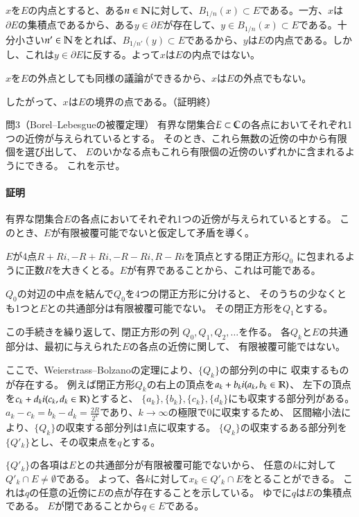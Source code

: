 $x$を$E$の内点とすると、ある$n\in\mathbb{N}$に対して、$B_{1/n}(x)\subset E$である。一方、$x$は$\partial E$の集積点であるから、ある$y\in\partial E$が存在して、$y\in B_{1/n}(x)\subset E$である。十分小さい$n'\in\mathbb{N}$をとれば、$B_{1/n'}(y)\subset E$であるから、$y$は$E$の内点である。しかし、これは$y\in\partial E$に反する。よって$x$は$E$の内点ではない。

$x$を$E$の外点としても同様の議論ができるから、$x$は$E$の外点でもない。

したがって、$x$は$E$の境界の点である。（証明終）

\begin{mysimplebox}{問3（Borel--Lebesgueの被覆定理）}
    有界な閉集合$E\subset\mathbb{C}$の各点においてそれぞれ1つの近傍が与えられているとする。
    そのとき、これら無数の近傍の中から有限個を選び出して、
    $E$のいかなる点もこれら有限個の近傍のいずれかに含まれるようにできる。
    これを示せ。
\end{mysimplebox}
\paragraph{証明}
有界な閉集合$E$の各点においてそれぞれ1つの近傍が与えられているとする。
このとき、$E$が有限被覆可能でないと仮定して矛盾を導く。

$E$が4点$R+Ri, -R+Ri, -R-Ri, R-Ri$を頂点とする閉正方形$Q_0$
に包まれるように正数$R$を大きくとる。$E$が有界であることから、これは可能である。

$Q_0$の対辺の中点を結んで$Q_0$を4つの閉正方形に分けると、
そのうちの少なくとも1つと$E$との共通部分は有限被覆可能でない。
その閉正方形を$Q_1$とする。

この手続きを繰り返して、閉正方形の列
$Q_0, Q_1, Q_2,\dots$を作る。
各$Q_k$と$E$の共通部分は、最初に与えられた$E$の各点の近傍に関して、
有限被覆可能ではない。

ここで、Weierstrass--Bolzanoの定理により、$\{Q_k\}$の部分列の中に
収束するものが存在する。
例えば閉正方形$Q_k$の右上の頂点を$a_k+b_{k}i (a_k,b_k\in\mathbb{R})$、
左下の頂点を$c_k+d_{k}i (c_k,d_k\in\mathbb{R})$とすると、
$\{a_k\}, \{b_k\},\{c_k\},\{d_k\}$にも収束する部分列がある。
$a_k-c_k=b_k-d_k=\frac{2R}{2^k}$であり、$k\longrightarrow\infty$の極限で0に収束するため、
区間縮小法により、$\{Q_k\}$の収束する部分列は1点に収束する。
$\{Q_k\}$の収束するある部分列を$\{Q'_k\}$とし、その収束点を$q$とする。

$\{Q'_k\}$の各項は$E$との共通部分が有限被覆可能でないから、
任意の$k$に対して$Q'_k\cap E\neq\emptyset$である。
よって、各$k$に対して$x_k\in Q'_k\cap E$をとることができる。
これは$q$の任意の近傍に$E$の点が存在することを示している。
ゆでに$q$は$E$の集積点である。
$E$が閉であることから$q\in E$である。

